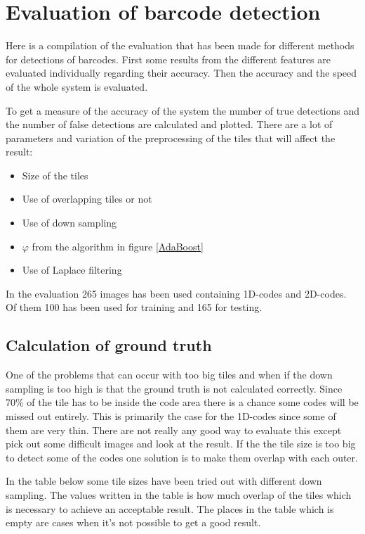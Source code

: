 \chapter{Evaluation of barcode detection}
\label{sec:Evaluation of barcode detection}
Here is a compilation of the evaluation that has been made for different methods for detections of barcodes. First some results from the different features are evaluated individually regarding their accuracy. Then the accuracy and the speed of the whole system is evaluated.

To get a measure of the accuracy of the system the number of true detections and the number of false detections are calculated and plotted. There are a lot of parameters and variation of the preprocessing of the tiles that will affect the result:

 \begin{itemize}
 	\item Size of the tiles
 	\item Use of overlapping tiles or not
 	\item Use of down sampling
 	\item $\varphi$ from the algorithm in figure \ref{AdaBoost}
 	\item Use of Laplace filtering 
 \end{itemize}

In the evaluation 265 images has been used containing 1D-codes and 2D-codes. Of them 100 has been used for training and 165 for testing.

\section{Calculation of ground truth}
\label{sec:Calculation of ground truth}
One of the problems that can occur with too big tiles and when if the down sampling is too high is that the ground truth is not calculated correctly. Since 70\% of the tile has to be inside the code area there is a chance some codes will be missed out entirely. This is primarily the case for the 1D-codes since some of them are very thin. There are not really any good way to evaluate this except pick out some difficult images and look at the result. If the the tile size is too big to detect some of the codes one solution is to make them overlap with each outer. 

In the table below some tile sizes have been tried out with different down sampling. The values written in the table is how much overlap of the tiles which is necessary to achieve an acceptable result. The places in the table which is empty are cases when it's not possible to get a good result.

